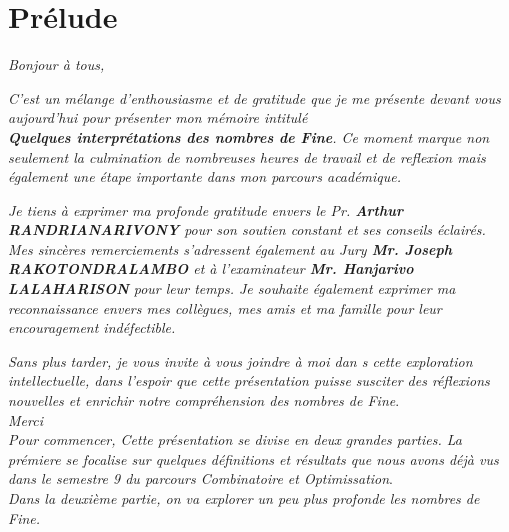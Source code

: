 \documentclass{report}
\begin{document}
    \section*{Prélude}
    \textit{Bonjour à tous,}

    \vspace{7pt}\textit{C'est un mélange d'enthousiasme et de gratitude que je me présente devant vous aujourd'hui pour présenter mon mémoire intitulé \\\textbf{Quelques interprétations des nombres de Fine}. Ce moment marque non seulement la culmination de nombreuses heures de travail et de reflexion mais également une étape importante dans mon parcours académique.}

    \vspace{7pt}\textit{Je tiens à exprimer ma profonde gratitude envers le Pr. \textbf{Arthur RANDRIANARIVONY} pour son soutien constant et ses conseils éclairés. Mes sincères remerciements s'adressent également au Jury \textbf{Mr. Joseph RAKOTONDRALAMBO} et à l'examinateur \textbf{Mr. Hanjarivo LALAHARISON} pour leur temps. Je souhaite également exprimer ma reconnaissance envers mes collègues, mes amis et ma famille pour leur encouragement indéfectible.}

    \vspace{7pt}\textit{Sans plus tarder, je vous invite à vous joindre à moi dan s cette exploration intellectuelle, dans l'espoir que cette présentation puisse susciter des réflexions nouvelles et enrichir notre compréhension des nombres de Fine}.\\
    \textit{Merci}\vspace{10pt}\\
    \textit{Pour commencer, Cette présentation se divise en deux grandes parties. La prémiere se focalise sur quelques définitions et résultats que nous avons déjà vus dans le semestre 9 du parcours Combinatoire et Optimissation}.\\
    \textit{Dans la deuxième partie, on va explorer un peu plus profonde les nombres de Fine.}
\end{document}
